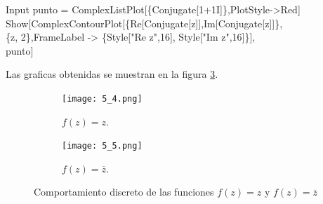 \begin{Ejem}
	\begin{mmaCell}{Input}
		punto = ComplexListPlot[\{Conjugate[1+1I]\},PlotStyle->Red]\\Show[ComplexContourPlot[\{Re[Conjugate[z]],Im[Conjugate[z]]\},\\\{z, 2\},FrameLabel -> \{Style["Re z",16], Style["Im z",16]\}],\\punto]
	\end{mmaCell}
	
	Las graficas obtenidas se muestran en la figura \ref{fig:ej_5D}.
	
	\begin{figure}[htbp!]
	\centering
	\begin{subfigure}{0.3\textwidth}
		\texttt{[image: 5\_4.png]}
		\caption{$f(z)=z$.}
		\label{fig:ej_5_4}
	\end{subfigure}
	\begin{subfigure}{0.3\textwidth}
		\texttt{[image: 5\_5.png]}
		\caption{$f(z)=\overline{z}$.}
		\label{fig:ej_5_5}
	\end{subfigure}
	\caption{Comportamiento discreto de las funciones $f(z)=z$ y $f(z)=\overline{z}$}
	\label{fig:ej_5D}
\end{figure}
\end{Ejem} 



